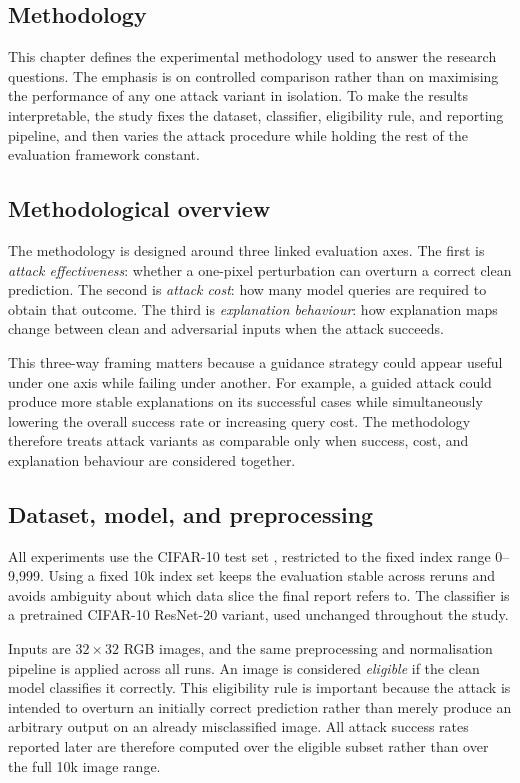 \subsection{Methodology}
\label{sec:method}

This chapter defines the experimental methodology used to answer the research questions.
The emphasis is on controlled comparison rather than on maximising the performance of any one attack variant in isolation.
To make the results interpretable, the study fixes the dataset, classifier, eligibility rule, and reporting pipeline, and then varies the attack procedure while holding the rest of the evaluation framework constant.

\subsection{Methodological overview}
The methodology is designed around three linked evaluation axes.
The first is \emph{attack effectiveness}: whether a one-pixel perturbation can overturn a correct clean prediction.
The second is \emph{attack cost}: how many model queries are required to obtain that outcome.
The third is \emph{explanation behaviour}: how explanation maps change between clean and adversarial inputs when the attack succeeds.

This three-way framing matters because a guidance strategy could appear useful under one axis while failing under another.
For example, a guided attack could produce more stable explanations on its successful cases while simultaneously lowering the overall success rate or increasing query cost.
The methodology therefore treats attack variants as comparable only when success, cost, and explanation behaviour are considered together.

\subsection{Dataset, model, and preprocessing}
All experiments use the CIFAR-10 test set \cite{krizhevsky2009cifar}, restricted to the fixed index range 0--9{,}999.
Using a fixed 10k index set keeps the evaluation stable across reruns and avoids ambiguity about which data slice the final report refers to.
The classifier is a pretrained CIFAR-10 ResNet-20 variant, used unchanged throughout the study.

Inputs are $32 \times 32$ RGB images, and the same preprocessing and normalisation pipeline is applied across all runs.
An image is considered \emph{eligible} if the clean model classifies it correctly.
This eligibility rule is important because the attack is intended to overturn an initially correct prediction rather than merely produce an arbitrary output on an already misclassified image.
All attack success rates reported later are therefore computed over the eligible subset rather than over the full 10k image range.


